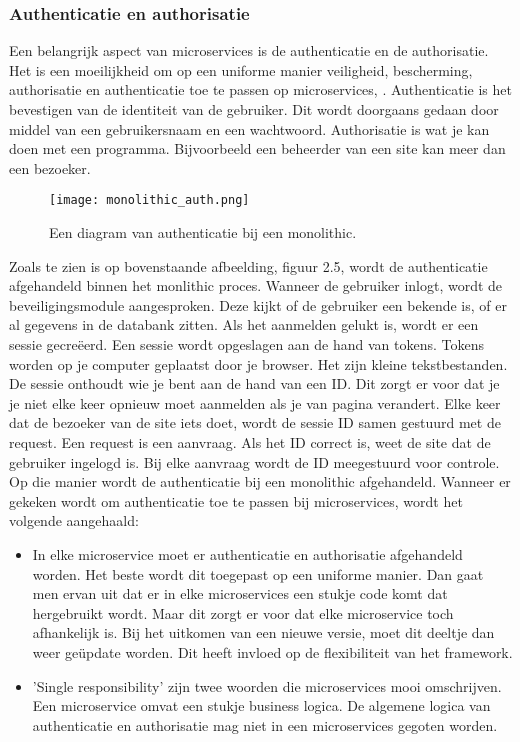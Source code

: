 \subsubsection{Authenticatie en authorisatie}
Een belangrijk aspect van microservices is de authenticatie en de authorisatie.  Het is een moeilijkheid om op een uniforme manier veiligheid, bescherming, authorisatie en authenticatie toe te passen op microservices, \textcite{Ayoub2018}. Authenticatie is het bevestigen van de identiteit van de gebruiker. Dit wordt doorgaans gedaan door middel van een gebruikersnaam en een wachtwoord. Authorisatie is wat je kan doen met een programma. Bijvoorbeeld een beheerder van een site kan meer dan een bezoeker. 
\begin{figure}[h!]
	\texttt{[image: monolithic\_auth.png]}
	\centering
	\caption{Een diagram van authenticatie bij een monolithic. \textcite{Ayoub2018}}
\end{figure}
Zoals te zien is op bovenstaande afbeelding, figuur 2.5, wordt de authenticatie afgehandeld binnen het monlithic proces. Wanneer de gebruiker inlogt, wordt de beveiligingsmodule aangesproken. Deze kijkt of de gebruiker een bekende is, of er al gegevens in de databank zitten. Als het aanmelden gelukt is, wordt er een sessie gecreëerd. Een sessie wordt opgeslagen aan de hand van tokens. Tokens worden op je computer geplaatst door je browser. Het zijn kleine tekstbestanden. De sessie onthoudt wie je bent aan de hand van een ID. Dit zorgt er voor dat je je niet elke keer opnieuw moet aanmelden als je van pagina verandert.  Elke keer dat de bezoeker van de site iets doet, wordt de sessie ID samen gestuurd met de request. Een request is een aanvraag. Als het ID correct is,  weet de site dat de gebruiker ingelogd is. Bij elke aanvraag wordt de ID meegestuurd voor controle. Op die manier wordt de authenticatie bij een monolithic afgehandeld.
Wanneer er gekeken wordt om authenticatie toe te passen bij microservices, wordt het volgende aangehaald:
\begin{itemize}
	\item In elke microservice moet er authenticatie en authorisatie afgehandeld worden. Het beste wordt dit toegepast op een uniforme manier. Dan gaat men ervan uit dat er in elke microservices een stukje code komt dat hergebruikt wordt. Maar dit zorgt er voor dat elke microservice toch afhankelijk is. Bij het uitkomen van een nieuwe  versie, moet dit deeltje dan  weer geüpdate worden. Dit heeft invloed op de flexibiliteit van het framework.
	\item 'Single responsibility' zijn twee woorden die microservices mooi omschrijven. Een microservice omvat een stukje business logica. De algemene logica van authenticatie en authorisatie mag niet in een microservices gegoten worden. 
\end{itemize}
